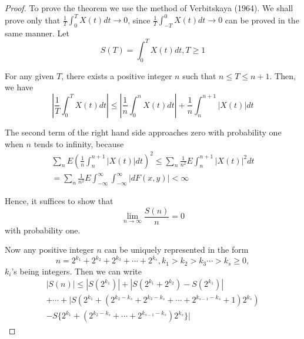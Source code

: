 \documentclass{article}
\begin{document}
\begin{proof}
To prove the theorem we use the method of Verbitskaya (1964). We shall prove only that $\frac{1}{T} \int_{0}^{T} X(t) dt \rightarrow 0$, since $\frac{1}{T} \int_{-T}^{0} X(t) dt \rightarrow 0$ can be proved in the same manner. Let
\begin{equation}\label{eq:49}
S(T)=\int_{0}^{T} X(t) dt, T \geq 1
\end{equation}

For any given $T$, there exists a positive integer $n$ such that $n \leq T \leq n+1$. Then, we have
\begin{equation}\label{eq:50}
\left|\frac{1}{T} \int_{0}^{T} X(t) dt\right| \leq \left|\frac{1}{n} \int_{0}^{n} X(t) dt\right|+\frac{1}{n} \int_{n}^{n+1}|X(t)| dt
\end{equation}

The second term of the right hand side approaches zero with probability one when $n$ tends to infinity, because
\begin{equation}\label{eq:51}
\begin{split}
\sum_{n} E\left(\frac{1}{n} \int_{n}^{n+1}|X(t)| dt\right)^{2} 
\leq \sum_{n} \frac{1}{n^{2}} E \int_{n}^{n+1}|X(t)|^{2} dt \\
= \sum_{n} \frac{1}{n^{2}} E \int_{-\infty}^{\infty} \int_{-\infty}^{\infty}|dF(x,y)|<\infty
\end{split}
\end{equation}

Hence, it suffices to show that
\begin{equation}\label{eq:52}
\lim_{n \rightarrow \infty} \frac{S(n)}{n}=0
\end{equation}
with probability one.

Now any positive integer $n$ can be uniquely represented in the form
\begin{equation}\label{eq:53}
n=2^{k_{1}}+2^{k_{2}}+2^{k_{3}}+\cdots+2^{k_{s}}, k_{1}>k_{2}>k_{3} \cdots>k_{s} \geq 0,
\end{equation}
$k_{i}$'s being integers. Then we can write
\begin{equation}\label{eq:54}
\begin{split}
|S(n)| \leq |S(2^{k_{1}})|+|S(2^{k_{1}}+2^{k_{2}})-S(2^{k_{1}})|\\
+\cdots+|S(2^{k_{1}}+(2^{k_{2}-k_{s}}+2^{k_{3}-k_{s}}+\cdots+2^{k_{s-1}-k_{s}}+1)2^{k_{s}})\\
-S\{2^{k_{1}}+(2^{k_{2}-k_{s}}+\cdots+2^{k_{s-1}-k_{s}})2^{k_{s}}\}|
\end{split}
\end{equation}


\end{proof}
\end{document}
